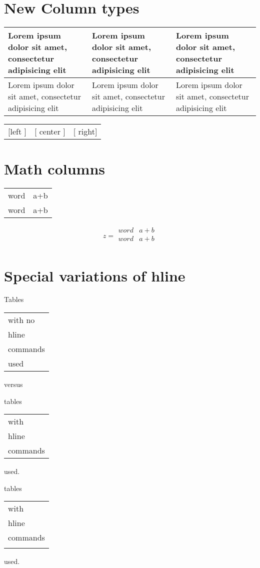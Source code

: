\documentclass{article}
\begin{document}
\section{New Column types}
\begin{tabular}{|p{1in}|m{1in}|b{1in}|}\hline
Lorem ipsum dolor sit amet, consectetur adipisicing elit &
Lorem ipsum dolor sit amet, consectetur adipisicing elit &
Lorem ipsum dolor sit amet, consectetur adipisicing elit \\\hline
Lorem ipsum dolor sit amet, consectetur adipisicing elit &
Lorem ipsum dolor sit amet, consectetur adipisicing elit &
Lorem ipsum dolor sit amet, consectetur adipisicing elit \\
\hline
\end{tabular}

\begin{tabular}{|>{[}l<{]}|>{[}c<{]}|>{[}r<{]}|}
left & center & right\\
\end{tabular}


\section{Math columns}
\begin{tabular}{cC}
word & a+b \\
word & a+b \\
\end{tabular}

\begin{equation}
z=
\begin{array}{Cc}
word & a+b \\
word & a+b \\
\end{array}
\end{equation}
\section{Special variations of hline}
Tables
\begin{tabular}[t]{l}
with no\\ hline \\ commands \\ used
\end{tabular} versus

tables
\begin{tabular}[t]{|l|}
\hline
with\\ hline \\ commands \\ 
\hline
\end{tabular} used.


tables
\begin{tabular}[t]{|l|}
\firsthline
with\\ hline \\ commands \\ 
\lasthline
\end{tabular} used.
\end{document}
